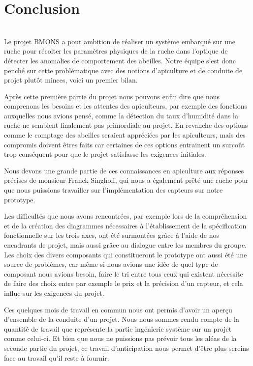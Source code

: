 \chapter{Conclusion}\\

Le projet BMONS a pour ambition de réaliser un système embarqué sur une ruche pour récolter les paramètres physiques de la ruche dans l’optique de détecter les anomalies de comportement des abeilles. Notre équipe s’est donc penché sur cette problématique avec des notions d’apiculture et de conduite de projet plutôt minces, voici un premier bilan.

Après cette première partie du projet nous pouvons enfin dire que nous comprenons les besoins et les attentes des apiculteurs, par exemple des fonctions auxquelles nous avions pensé, comme la détection du taux d'humidité dans la ruche ne semblent finalement pas primordiale au projet. En revanche des options comme le comptage des abeilles seraient appréciées par les apiculteurs, mais des compromis doivent êtres faits car certaines de ces options entrainent un surcoût trop conséquent pour que le projet satisfasse les exigences initiales.\newline 

Nous devons une grande partie de ces connaissances en apiculture aux réponses précises de monsieur Franck Singhoff, qui nous a également prêté une ruche pour que nous puissions travailler sur l'implémentation des capteurs sur notre prototype. \newline 

Les difficultés que nous avons rencontrées, par exemple lors de la compréhension et de la création des diagrammes nécessaires à l’établissement de la spécification fonctionnelle sur les trois axes, ont été surmontées grâce à l’aide de nos encadrants de projet, mais aussi grâce au dialogue entre les membres du groupe. Les choix des divers composants qui constitueront le prototype ont aussi été une source de problèmes, car même si nous avions une idée de quel type de composant nous avions besoin, faire le tri entre tous ceux qui existent nécessite de faire des choix entre par exemple le prix et la précision d’un capteur, et cela influe sur les exigences du projet. \newline

Ces quelques mois de travail en commun nous ont permis d'avoir un aperçu d'ensemble de la conduite d'un projet. Nous nous sommes rendu compte de la quantité de travail que représente la partie ingénierie système sur un projet comme celui-ci. Et bien que nous ne puissions pas prévoir tous les aléas de la seconde partie du projet, ce travail d'anticipation nous permet d'être plus sereins face au travail qu'il reste à fournir.\newline​


